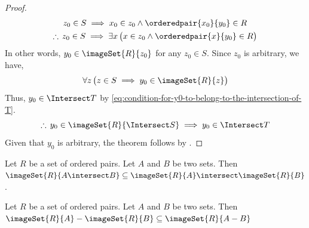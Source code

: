 \begin{proof}
\begin{gather*}
        z_{0} \in S \implies x_{0} \in z_{0} \land \orderedpair{x_{0}}{y_{0}} \in R \\
        \therefore \, z_{0} \in S \implies \exists x \, \big( x \in z_{0} \land \orderedpair{x}{y_{0}} \in R \big)
    \end{gather*}
    In other words, \( y_{0} \in \imageSet{R}{z_{0}} \) for any \( z_{0} \in S \). Since \( z_{0} \) is arbitrary, we have,
    \begin{equation*}
        \forall z \, \big( z \in S \implies y_{0} \in \imageSet{R}{z} \big)
    \end{equation*}
    Thus, \( y_{0} \in \Intersect T \) by \eqref{eq:condition-for-y0-to-belong-to-the-intersection-of-T}.
    \begin{equation*}
        \therefore \, y_{0} \in \imageSet{R}{\Intersect S} \implies y_{0} \in \Intersect T
    \end{equation*}
    Given that \( y_{0} \) is arbitrary, the theorem follows by .
\end{proof}

\begin{cor}
    \label{thm:the-image-of-A-intersect-B-under-R-is-a-subset-of-the-image-of-A-under-R-intersect-the-image-of-B-under-R}
    Let \( R \) be a set of ordered pairs. Let \( A \) and \( B \) be two sets.
    Then \( \imageSet{R}{A \intersect B} \subseteq \imageSet{R}{A} \intersect \imageSet{R}{B} \).
\end{cor}

\begin{thm}
    \label{thm:the-difference-of-image-is-a-subset-of-the-image-of-difference}
    Let \( R \) be a set of ordered pairs. Let \( A \) and \( B \) be two sets. Then \( \imageSet{R}{A} - \imageSet{R}{B} \subseteq \imageSet{R}{A - B} \)
\end{thm}

